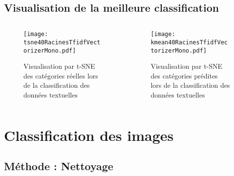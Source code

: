 \documentclass[8pt,aspectratio=169,hyperref={unicode=true}]{beamer}
\begin{document}
\subsection{Visualisation de la meilleure classification}
\begin{frame}{\insertsubsection}
    \begin{columns}
        \begin{column}{.5\textwidth}
            \begin{figure}
                \texttt{[image: tsne40RacinesTfidfVectorizerMono.pdf]}
                \caption{Visualisation par t-SNE des catégories réelles lors de la classification des données textuelles}
            \end{figure}
        \end{column}
        \begin{column}{.5\textwidth}
            \begin{figure}
                \texttt{[image: kmean40RacinesTfidfVectorizerMono.pdf]}
                \caption{Visualisation par t-SNE des catégories prédites lors de la classification des données textuelles}
            \end{figure}
        \end{column}
    \end{columns}
\end{frame}

\section{Classification des images}
\subsection{Méthode : Nettoyage}
\end{document}
